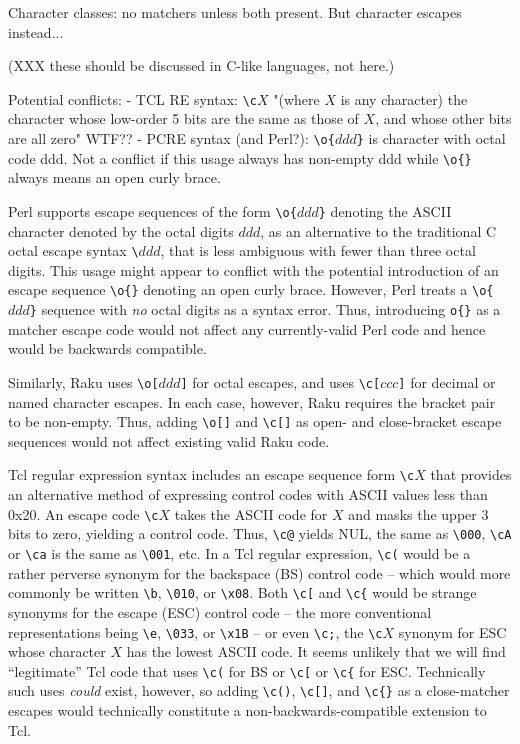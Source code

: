 Character classes: no matchers unless both present.
But character escapes instead...

(XXX these should be discussed in C-like languages, not here.)

Potential conflicts:
- TCL RE syntax: \verb|\c|$X$ "(where $X$ is any character) the character whose low-order 5 bits are the same as those of $X$, and whose other bits are all zero"
WTF??
- PCRE syntax (and Perl?): \verb|\o{|$ddd$\verb|}| is character with octal code ddd.  Not a conflict if this usage always has non-empty ddd while \verb|\o{}| always means an open curly brace.

Perl supports escape sequences of the form \verb|\o{|$ddd$\verb|}|
denoting the ASCII character denoted by the octal digits $ddd$,
as an alternative to the traditional C octal escape syntax \verb|\|$ddd$,
that is less ambiguous with fewer than three octal digits.
This usage might appear to conflict with the potential introduction
of an escape sequence \verb|\o{}| denoting an open curly brace.
However, Perl treats a \verb|\o{|$ddd$\verb|}| sequence
with \emph{no} octal digits as a syntax error.
Thus, introducing \verb|o{}| as a matcher escape code
would not affect any currently-valid Perl code
and hence would be backwards compatible.

Similarly, Raku uses \verb|\o[|$ddd$\verb|]| for octal escapes,
and uses \verb|\c[|$ccc$\verb|]|
for decimal or named character escapes.
In each case, however, Raku requires the bracket pair to be non-empty.
Thus, adding \verb|\o[]| and \verb|\c[]|
as open- and close-bracket escape sequences
would not affect existing valid Raku code.

Tcl regular expression syntax includes an escape sequence form
\verb|\c|$X$ that provides an alternative method of expressing control codes
with ASCII values less than 0x20.
An escape code \verb|\c|$X$ takes the ASCII code for $X$
and masks the upper 3 bits to zero, yielding a control code.
Thus, \verb|\c@| yields NUL, the same as \verb|\000|,
\verb|\cA| or \verb|\ca| is the same as \verb|\001|, etc.
In a Tcl regular expression,
\verb|\c(| would be a rather perverse synonym for
the backspace (BS) control code --
which would more commonly be written \verb|\b|, \verb|\010|, or \verb|\x08|.
Both \verb|\c[| and \verb|\c{|
would be strange synonyms for the escape (ESC) control code --
the more conventional representations
being \verb|\e|, \verb|\033|, or \verb|\x1B| --
or even \verb|\c;|, the \verb|\c|$X$ synonym for ESC
whose character $X$ has the lowest ASCII code.
It seems unlikely that we will find ``legitimate'' Tcl code 
that uses \verb|\c(| for BS or \verb|\c[| or \verb|\c{| for ESC.
Technically such uses \emph{could} exist, however,
so adding \verb|\c()|, \verb|\c[]|, and \verb|\c{}| as a close-matcher escapes
would technically constitute a non-backwards-compatible extension to Tcl.

